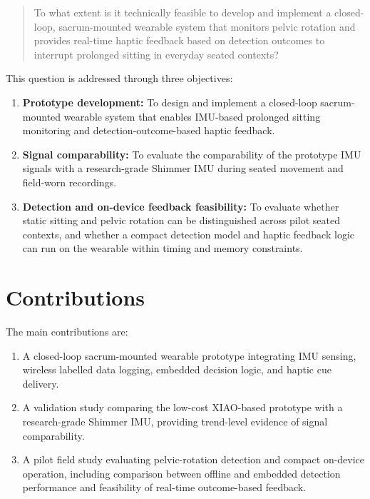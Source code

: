 \begin{quote}
To what extent is it technically feasible to develop and implement a closed-loop, sacrum-mounted wearable system that monitors pelvic rotation and provides real-time haptic feedback based on detection outcomes to interrupt prolonged sitting in everyday seated contexts?
\end{quote}

This question is addressed through three objectives:

\begin{enumerate}
    \item \textbf{Prototype development:} To design and implement a closed-loop sacrum-mounted wearable system that enables IMU-based prolonged sitting monitoring and detection-outcome-based haptic feedback.
    \item \textbf{Signal comparability:} To evaluate the comparability of the prototype IMU signals with a research-grade Shimmer IMU during seated movement and field-worn recordings.
    \item \textbf{Detection and on-device feedback feasibility:} To evaluate whether static sitting and pelvic rotation can be distinguished across pilot seated contexts, and whether a compact detection model and haptic feedback logic can run on the wearable within timing and memory constraints.
\end{enumerate}

\section{Contributions}\label{sec:intro_contributions}

The main contributions are:

\begin{enumerate}
    \item A closed-loop sacrum-mounted wearable prototype integrating IMU sensing, wireless labelled data logging, embedded decision logic, and haptic cue delivery.
    \item A validation study comparing the low-cost XIAO-based prototype with a research-grade Shimmer IMU, providing trend-level evidence of signal comparability.
    \item A pilot field study evaluating pelvic-rotation detection and compact on-device operation, including comparison between offline and embedded detection performance and feasibility of real-time outcome-based feedback.
\end{enumerate}

